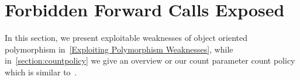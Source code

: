 \section{Forbidden Forward Calls Exposed}
\label{C++ Bad Forward Indirect Calls}
In this section,
we present exploitable weaknesses of object oriented polymorphism in~\cref{Exploiting Polymorphism Weaknesses},
while in~\cref{section:countpolicy} we give an overview or our count parameter count policy which is similar to~\cite{veen:typearmor}.


